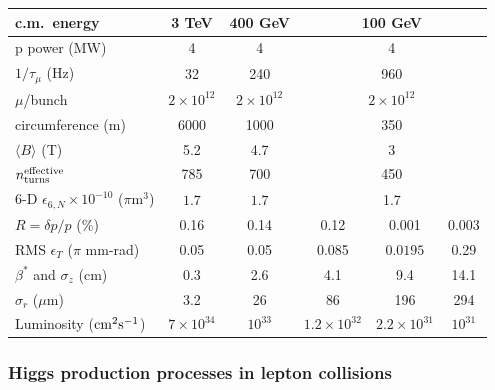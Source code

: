 \begin{table}[ht]
\begin{center}
\begin{tabular}{|l|c|c|ccc|} 
  \hline
c.m.\ energy      & 3 TeV            & 400 GeV & \multicolumn{3}{c|}{100 GeV} \\
  \hline
p power (MW)    & 4                & 4   &  \multicolumn{3}{c|}{4} \\
$1/\tau_\mu$ (Hz)& 32               & 240 &  \multicolumn{3}{c|}{960} \\
$\mu$/bunch      & $2\times10^{12}$ & $2\times10^{12}$ & \multicolumn{3}{c|}{$2\times10^{12}$} \\
circumference (m)& 6000             & 1000& \multicolumn{3}{c|}{350} \\
$\langle B\rangle$ (T)     & 5.2              & 4.7 & \multicolumn{3}{c|}{3} \\
$n^{\rm effective}_{\rm turns}$&785         & 700 & \multicolumn{3}{c|}{450} \\
6-D $\epsilon_{6,N} \times10^{-10}$ ($\pi$m$^3$) &$1.7$& $1.7$ &  
\multicolumn{3}{c|}{1.7}\\
$R=\delta p/p$ (\%)& 0.16             & 0.14& 0.12 & 0.001 & 0.003 \\
RMS $\epsilon_T$ ($\pi$ mm-rad)
                 & 0.05            & 0.05 & 0.085& $0.0195$ & 0.29 \\
$\beta^*$ and $\sigma_z$    (cm)   & 0.3             & 2.6  & 4.1& 9.4 & 14.1 \\
$\sigma_r$ ($\mu$m)& 3.2           & 26   & 86   & 196 & 294 \\ \hline
Luminosity (${\rm cm^2s^{-1} }$)& $7\times10^{34}$ & $10^{33}$ 
& $1.2\times10^{32}$ & $2.2 \times10^{31}$ & $10^{31}$  \\ \hline
\end{tabular}
\end{center}
\vspace*{-3mm}
\end{table}

\subsubsection{Higgs production processes in lepton collisions}

